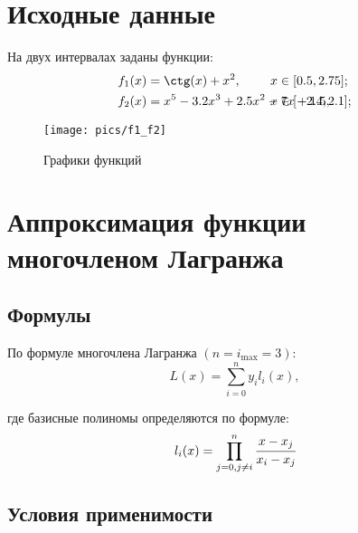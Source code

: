 






\setcounter{page}{2}
\tableofcontents
\clearpage
\section*{Исходные данные}

На двух интервалах заданы функции:
\begin{align}
    \label{f1}
    f_1(x) &= \ctg(x) + x^2, &\hspace{-2cm}  x &\in [0.5, 2.75]; \\
    \label{f2}
    f_2(x) &= x^5 - 3.2x^3 + 2.5x^2 - 7x + 1.5, &\hspace{-2cm} x &\in [-2.4, 2.1];
\end{align}

\begin{figure}[h] \centering
    \caption{Графики функций}
    \texttt{[image: pics/f1\_f2]}
    \label{pic:f1_f2}
\end{figure}

\clearpage

\section{Аппроксимация функции многочленом Лагранжа}

\subsection{Формулы}

По формуле многочлена Лагранжа $(n=i_{\max} = 3)$:
\begin{equation}
    L(x)=\sum_{i=0}^{n}y_il_i(x),
\end{equation}

где базисные полиномы определяются по формуле:
\begin{equation}
    \label{l_i}
    l_i(x)=\prod_{j=0,j\ne i}^{n}\cfrac{x-x_j}{x_i-x_j}
\end{equation}

\subsection{Условия применимости}

